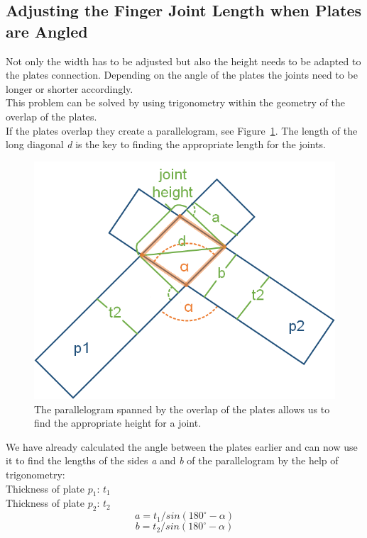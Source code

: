 \documentclass[../ClassicThesis.tex]{subfiles}
\begin{document}
\subsection{Adjusting the Finger Joint Length when Plates are Angled}
    Not only the width has to be adjusted but also the height needs to be adapted to the plates connection. Depending on the angle of the plates the joints need to be longer or shorter accordingly.\\
    This problem can be solved by using trigonometry within the geometry of the overlap of the plates.\\
    If the plates overlap they create a parallelogram, see Figure~\ref{fig:newJointHeight}. The length of the long diagonal \emph{d} is the key to finding the appropriate length for the joints.
    \begin{figure}[!ht]
    \centering
    \includegraphics[width=\columnwidth]{Images/06-2-joints-newJointHeight.png}
    \caption{The parallelogram spanned by the overlap of the plates allows us to find the appropriate height for a joint.}
    \label{fig:newJointHeight}
    \end{figure}
    
    We have already calculated the angle between the plates earlier and can now use it to find the lengths of the sides \emph{a} and \emph{b} of the parallelogram by the help of trigonometry:\\
    Thickness of plate $p_1$: $t_1$\\
    Thickness of plate $p_2$: $t_2$
    $$ a = t_1 / sin(180^{\circ} - \alpha)$$
    $$ b = t_2 / sin(180^{\circ} - \alpha)$$
    
\end{document}
